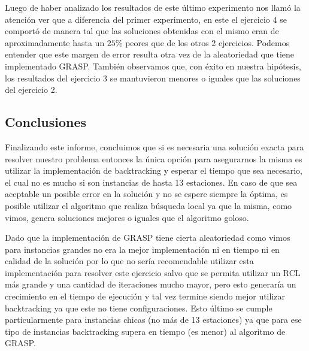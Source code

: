         Luego de haber analizado los resultados de este último experimento nos llamó la atención ver que a diferencia del primer experimento, en este el ejercicio 4 se comportó de manera tal que las soluciones obtenidas con el mismo eran de aproximadamente hasta un $25\%$ peores que de los otros 2 ejercicios. Podemos entender que este margen de error resulta otra vez de la aleatoriedad que tiene implementado GRASP. También observamos que, con éxito en nuestra hipótesis, los resultados del ejercicio 3 se mantuvieron menores o iguales que las soluciones del ejercicio 2.

    \subsection{Conclusiones}
        Finalizando este informe, concluimos que si es necesaria una solución exacta para resolver nuestro problema entonces la única opción para asegurarnos la misma es utilizar la implementación de backtracking y esperar el tiempo que sea necesario, el cual no es mucho si son instancias de hasta 13 estaciones. En caso de que sea aceptable un posible error en la solución y no se espere siempre la óptima, es posible utilizar el algoritmo que realiza búsqueda local ya que la misma, como vimos, genera soluciones mejores o iguales que el algoritmo goloso.

        Dado que la implementación de GRASP tiene cierta aleatoriedad como vimos para instancias grandes no era la mejor implementación ni en tiempo ni en calidad de la solución por lo que no sería recomendable utilizar esta implementación para resolver este ejercicio salvo que se permita utilizar un RCL más grande y una cantidad de iteraciones mucho mayor, pero esto generaría un crecimiento en el tiempo de ejecución y tal vez termine siendo mejor utilizar backtracking ya que este no tiene configuraciones. Esto último se cumple particularmente para instancias chicas (no más de 13 estaciones) ya que para ese tipo de instancias backtracking supera en tiempo (es menor) al algoritmo de GRASP.
